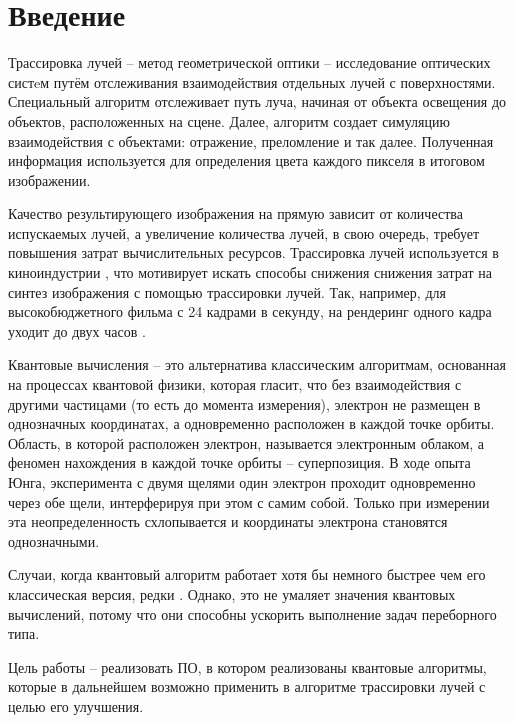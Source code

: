 \chapter*{Введение}

Трассировка лучей -- метод геометрической оптики -- исследование оптических систeм путём отслеживания взаимодействия отдельных лучей с поверхностями. Специальный алгоритм отслеживает путь луча, начиная от объекта освещения до объектов, расположенных на сцене. Далее, алгоритм создает симуляцию взаимодействия с объектами: отражение, преломление и так далее. Полученная информация используется для определения цвета каждого пикселя в итоговом изображении. 

Качество результирующего изображения на прямую зависит от количества испускаемых лучей, а увеличение количества лучей, в свою очередь, требует повышения затрат вычислительных ресурсов. Трассировка лучей используется в киноиндустрии \cite{path-traced-movies}, что мотивирует искать способы снижения снижения затрат на синтез изображения с помощью трассировки лучей. Так, например, для высокобюджетного фильма с 24 кадрами в секунду, на рендеринг одного кадра уходит до двух часов \cite{path-traced-movies}.

Квантовые вычисления -- это альтернатива классическим алгоритмам, основанная на процессах квантовой физики, которая гласит, что без взаимодействия с другими частицами (то есть до момента измерения), электрон не размещен в однозначных координатах, а одновременно расположен в каждой точке орбиты. Область, в которой расположен электрон, называется электронным облаком, а феномен нахождения в каждой точке орбиты -- суперпозиция. В ходе опыта Юнга, эксперимента с двумя щелями один электрон проходит одновременно через обе щели, интерферируя при этом с самим собой. Только при измерении эта неопределенность схлопывается и координаты электрона становятся однозначными.

Случаи, когда квантовый алгоритм работает хотя бы немного быстрее чем его классическая версия, редки \cite{quantum-computers-speed-up}. Однако, это не умаляет значения квантовых вычислений, потому что они способны ускорить выполнение задач переборного типа. 

Цель работы -- реализовать ПО, в котором реализованы квантовые алгоритмы, которые в дальнейшем возможно применить в алгоритме трассировки лучей с целью его улучшения.

